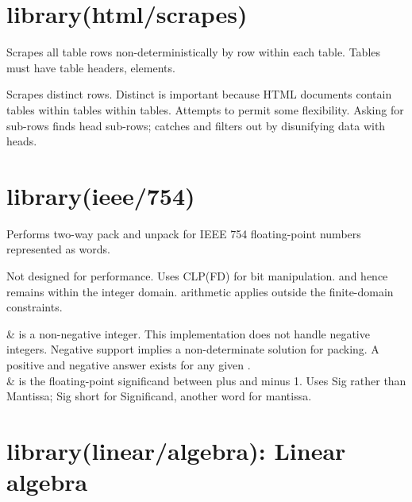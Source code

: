 \chapter{library(html/scrapes)}\label{sec:scrapes}

\begin{description}
Scrapes all table rows non-deterministically by row within each
table. Tables must have table headers,  elements.

Scrapes distinct rows. Distinct is important because HTML documents
contain tables within tables within tables. Attempts to permit some
flexibility. Asking for sub-rows finds head sub-rows; catches and
filters out by disunifying data with heads.
\end{description}

\chapter{library(ieee/754)}\label{sec:754}

\begin{description}
\nodescription
Performs two-way pack and unpack for IEEE 754 floating-point numbers
represented as words.

Not designed for performance. Uses CLP(FD) for bit manipulation. and
hence remains within the integer domain.  arithmetic applies
outside the finite-domain constraints.

\begin{arguments}
 & is a non-negative integer. This implementation does not
handle negative integers. Negative support implies a non-determinate
solution for packing. A positive and negative answer exists for any
given . \\
 & is the floating-point significand between plus and minus 1.
Uses Sig rather than Mantissa; Sig short for Significand, another
word for mantissa. \\
\end{arguments}
\end{description}

\chapter{library(linear/algebra): Linear algebra}\label{sec:algebra}

